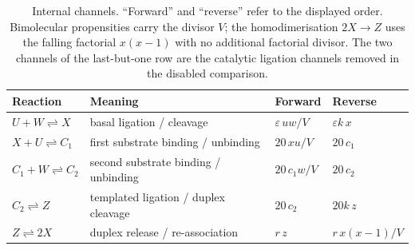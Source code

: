\documentclass[11pt,a4paper]{article}
\theoremstyle{plain}
\theoremstyle{definition}
\theoremstyle{remark}
\newcommand{\eps}{\varepsilon}
\begin{document}
\begin{table}[t]
\centering
\caption{Internal channels. ``Forward'' and ``reverse'' refer to the displayed order. Bimolecular propensities carry the divisor $V$; the homodimerisation $2X\to Z$ uses the falling factorial $x(x-1)$ with no additional factorial divisor. The two channels of the last-but-one row are the catalytic ligation channels removed in the disabled comparison.}\label{tab:rates}
\small
\begin{tabular}{llll}
\toprule
Reaction & Meaning & Forward & Reverse\\
\midrule
$U+W\rightleftharpoons X$ & basal ligation / cleavage & $\eps\,uw/V$ & $\eps k\,x$\\
$X+U\rightleftharpoons C_1$ & first substrate binding / unbinding & $20\,xu/V$ & $20\,c_1$\\
$C_1+W\rightleftharpoons C_2$ & second substrate binding / unbinding & $20\,c_1w/V$ & $20\,c_2$\\
$C_2\rightleftharpoons Z$ & templated ligation / duplex cleavage & $20\,c_2$ & $20k\,z$\\
$Z\rightleftharpoons 2X$ & duplex release / re-association & $r\,z$ & $r\,x(x-1)/V$\\
\bottomrule
\end{tabular}
\end{table}
\end{document}
